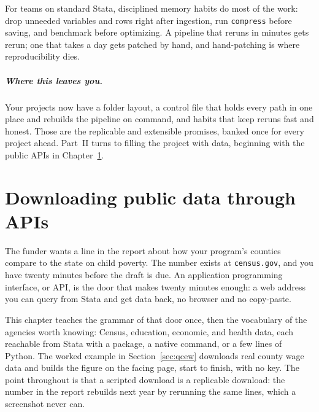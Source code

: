 \documentclass[
    a4paper,
    fontsize=10pt,
    twoside=true,
    numbers=noenddot,
]{kaobook}
\begin{document}
For teams on standard Stata, disciplined memory habits do most of the work: drop unneeded variables and rows right after ingestion, run \texttt{compress} before saving, and benchmark before optimizing. A pipeline that reruns in minutes gets rerun; one that takes a day gets patched by hand, and hand-patching is where reproducibility dies.

\paragraph{Where this leaves you.} Your projects now have a folder layout, a control file that holds every path in one place and rebuilds the pipeline on command, and habits that keep reruns fast and honest. Those are the replicable and extensible promises, banked once for every project ahead. Part~II turns to filling the project with data, beginning with the public APIs in Chapter~\ref{ch:apis}.



\chapter{Downloading public data through APIs}\label{ch:apis}

The funder wants a line in the report about how your program's counties compare to the state on child poverty. The number exists at \texttt{census.gov}, and you have twenty minutes before the draft is due. An application programming interface, or API, is the door that makes twenty minutes enough: a web address you can query from Stata and get data back, no browser and no copy-paste.

This chapter teaches the grammar of that door once, then the vocabulary of the agencies worth knowing: Census, education, economic, and health data, each reachable from Stata with a package, a native command, or a few lines of Python. The worked example in Section~\ref{sec:qcew} downloads real county wage data and builds the figure on the facing page, start to finish, with no key. The point throughout is that a scripted download is a replicable download: the number in the report rebuilds next year by rerunning the same lines, which a screenshot never can.
\end{document}
